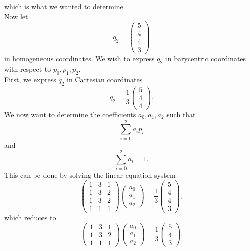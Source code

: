 \documentclass[]{article}
\begin{document}
which is what we wanted to determine.\\
Now let \begin{equation*}
q_2 = \left(\begin{array}{c}
5\\
4\\
4\\
3
\end{array}\right)
\end{equation*}
in homogeneous coordinates. We wish to express $q_2$ in barycentric coordinates with respect to $p_0, p_1, p_2$.\\
First, we express $q_2$ in Cartesian coordinates \begin{equation*}
q_2 = \frac{1}{3}\left(\begin{array}{c}
5\\
4\\
4
\end{array}\right).
\end{equation*}
We now want to determine the coefficients $a_0, a_1, a_2$ such that \begin{equation*}
\sum_{i=0}^{2}a_ip_i
\end{equation*}
and \begin{equation*}
\sum_{i=0}^{2}a_i=1.
\end{equation*}
This can be done by solving the linear equation system \begin{equation*}
\left(\begin{array}{ccc}
1 & 3 & 1\\
1 & 3 & 2\\
1 & 3 & 2\\
1 & 1 & 1
\end{array}\right)\left(\begin{array}{c}
a_0\\
a_1\\
a_2
\end{array}\right) = \frac{1}{3}\left(\begin{array}{c}
5\\
4\\
4\\
3
\end{array}\right),
\end{equation*}
which reduces to \begin{equation*}
\left(\begin{array}{ccc}
1 & 3 & 1\\
1 & 3 & 2\\
1 & 1 & 1
\end{array}\right)\left(\begin{array}{c}
a_0\\
a_1\\
a_2
\end{array}\right) = \frac{1}{3}\left(\begin{array}{c}
5\\
4\\
3
\end{array}\right).
\end{equation*}
\end{document}
